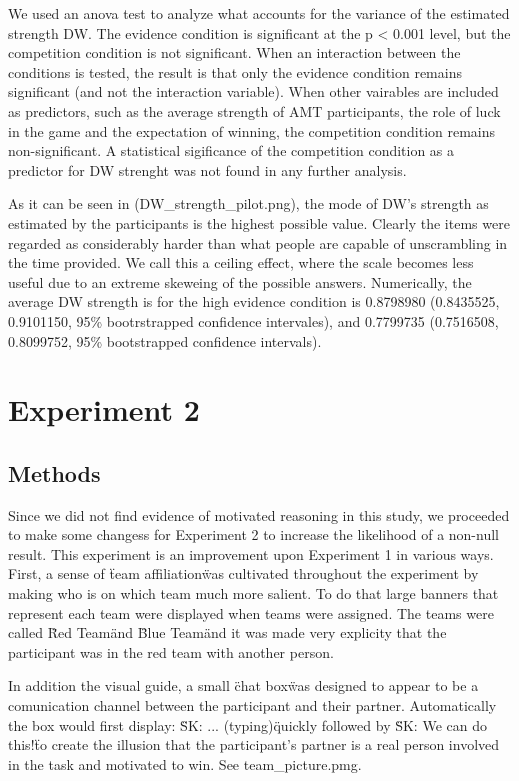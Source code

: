 \documentclass{article} \usepackage{apacite} \usepackage{graphicx} \usepackage{listings}
\begin{document}
We used an anova test to analyze what accounts for the variance of the estimated strength DW. The evidence condition is significant at the p < 0.001 level, but the competition condition is not significant. When an interaction between the conditions is tested, the result is that only the evidence condition remains significant (and not the interaction variable). When other vairables are included as predictors, such as the average strength of AMT participants, the role of luck in the game and the expectation of winning, the competition condition remains non-significant. A statistical sigificance of the competition condition as a predictor for DW strenght was not found in any further analysis.

As it can be seen in (DW_strength_pilot.png), the mode of DW's strength as estimated by the participants is the highest possible value. Clearly the items were regarded as considerably harder than what people are capable of unscrambling in the time provided. We call this a ceiling effect, where the scale becomes less useful due to an extreme skeweing of the possible answers. Numerically, the average DW strength is for the high evidence condition is 0.8798980 (0.8435525, 0.9101150, 95\% bootrstrapped confidence intervales), and 0.7799735 (0.7516508, 0.8099752, 95\% bootstrapped confidence intervals).

\section{Experiment 2}

\subsection{Methods}


Since we did not find evidence of motivated reasoning in this study, we proceeded to make some changess for Experiment 2 to increase the likelihood of a non-null result. This experiment is an improvement upon Experiment 1 in various ways. First, a sense of \"team affiliation\" was cultivated throughout the experiment by making who is on which team much more salient. To do that large banners that represent each team were displayed when teams were assigned. The teams were called \"Red Team\" and \"Blue Team\" and it was made very explicity that the participant was in the red team with another person. 

In addition the visual guide, a small \"chat box\" was designed to appear to be a comunication channel between the participant and their partner. Automatically the box would first display: \"SK: ... (typing)\" quickly followed by \"SK: We can do this!\" to create the illusion that the participant's partner is a real person involved in the task and motivated to win. See team_picture.pmg.
\end{document}
